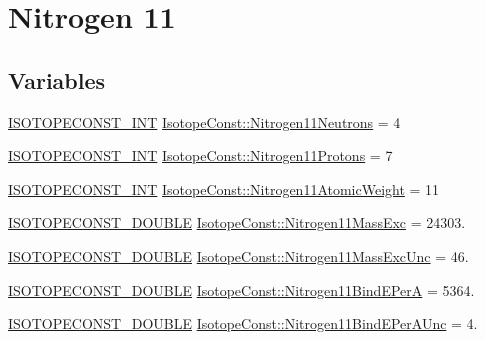 \hypertarget{group___isotope_const-_nitrogen-_n11}{}\section{Nitrogen 11}
\label{group___isotope_const-_nitrogen-_n11}
\subsection*{Variables}
\begin{DoxyCompactItemize}
\item 
\mbox{\hyperlink{group___isotope_const-_macros_ga5f18360b3e99483a35c32d789e62621c}{I\+S\+O\+T\+O\+P\+E\+C\+O\+N\+S\+T\+\_\+\+I\+NT}} \mbox{\hyperlink{group___isotope_const-_nitrogen-_n11_ga1ec16359a3a806a4d95d581d2df1a36c}{Isotope\+Const\+::\+Nitrogen11\+Neutrons}} = 4
\item 
\mbox{\hyperlink{group___isotope_const-_macros_ga5f18360b3e99483a35c32d789e62621c}{I\+S\+O\+T\+O\+P\+E\+C\+O\+N\+S\+T\+\_\+\+I\+NT}} \mbox{\hyperlink{group___isotope_const-_nitrogen-_n11_gaac38f39dc6567422dc4aa16e44ca9d30}{Isotope\+Const\+::\+Nitrogen11\+Protons}} = 7
\item 
\mbox{\hyperlink{group___isotope_const-_macros_ga5f18360b3e99483a35c32d789e62621c}{I\+S\+O\+T\+O\+P\+E\+C\+O\+N\+S\+T\+\_\+\+I\+NT}} \mbox{\hyperlink{group___isotope_const-_nitrogen-_n11_ga3209400000bbe223c43f45a0e008fff5}{Isotope\+Const\+::\+Nitrogen11\+Atomic\+Weight}} = 11
\item 
\mbox{\hyperlink{group___isotope_const-_macros_ga8f45a7272ce02c0b4c65c44636ed719a}{I\+S\+O\+T\+O\+P\+E\+C\+O\+N\+S\+T\+\_\+\+D\+O\+U\+B\+LE}} \mbox{\hyperlink{group___isotope_const-_nitrogen-_n11_ga93d7c62c606de58cc3df0cfbe4607565}{Isotope\+Const\+::\+Nitrogen11\+Mass\+Exc}} = 24303.
\item 
\mbox{\hyperlink{group___isotope_const-_macros_ga8f45a7272ce02c0b4c65c44636ed719a}{I\+S\+O\+T\+O\+P\+E\+C\+O\+N\+S\+T\+\_\+\+D\+O\+U\+B\+LE}} \mbox{\hyperlink{group___isotope_const-_nitrogen-_n11_ga84c903edfdf73d883e655672e45a3350}{Isotope\+Const\+::\+Nitrogen11\+Mass\+Exc\+Unc}} = 46.
\item 
\mbox{\hyperlink{group___isotope_const-_macros_ga8f45a7272ce02c0b4c65c44636ed719a}{I\+S\+O\+T\+O\+P\+E\+C\+O\+N\+S\+T\+\_\+\+D\+O\+U\+B\+LE}} \mbox{\hyperlink{group___isotope_const-_nitrogen-_n11_ga375a16c1f6c60fa14e84d6eca36a6df6}{Isotope\+Const\+::\+Nitrogen11\+Bind\+E\+PerA}} = 5364.
\item 
\mbox{\hyperlink{group___isotope_const-_macros_ga8f45a7272ce02c0b4c65c44636ed719a}{I\+S\+O\+T\+O\+P\+E\+C\+O\+N\+S\+T\+\_\+\+D\+O\+U\+B\+LE}} \mbox{\hyperlink{group___isotope_const-_nitrogen-_n11_ga7be0d21808ac6f1483ddac420951eff2}{Isotope\+Const\+::\+Nitrogen11\+Bind\+E\+Per\+A\+Unc}} = 4.

\end{DoxyCompactItemize}

